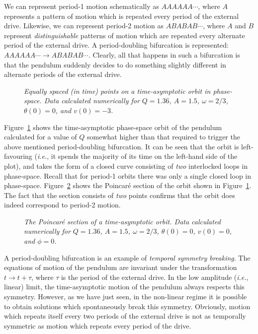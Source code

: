 We can represent period-1 motion schematically as $AAAAAA\cdots$, where $A$ represents a pattern
of motion which is repeated every period of the external drive. Likewise, we can represent
period-2 motion as $ABABAB\cdots$, where $A$ and $B$ represent {\em distinguishable}\/  patterns of motion
which are repeated every alternate period of the external drive. A period-doubling
bifurcation is represented: $AAAAAA\cdots\rightarrow ABABAB\cdots$. Clearly, all that happens
in such a bifurcation is that the pendulum suddenly decides to do something slightly different in
alternate periods of the external drive.

\begin{figure}
\epsfysize=2.5in
\centerline{}
\caption{\em Equally spaced (in time) points on a time-asymptotic orbit in phase-space. Data
calculated numerically for $Q=1.36$, $A=1.5$, $\omega=2/3$, $\theta(0)=0$,
and $v(0)=-3$. }\label{f30}
\end{figure}

Figure~\ref{f30} shows the time-asymptotic phase-space orbit of the pendulum calculated for a
value of $Q$ somewhat higher than that required to trigger the above mentioned period-doubling bifurcation. It can
be seen that the orbit is left-favouring ({\em i.e.}, it spends the majority of its time on
the left-hand side of the plot), and takes the form of a closed curve consisting of
{\em two}\/ interlocked loops in phase-space.
Recall that for period-1 orbits there was only a single closed  loop in phase-space.
Figure~\ref{f31} shows the Poincar\'{e} section of the orbit shown in Figure~\ref{f30}. 
The fact that the section consists
of {\em two}\/ points confirms that the orbit does indeed correspond to period-2 motion.

\begin{figure}
\epsfysize=2.5in
\centerline{}
\caption{\em The Poincar\'{e} section of a time-asymptotic
orbit. Data calculated numerically for $Q=1.36$, $A=1.5$, $\omega=2/3$, $\theta(0)=0$,
$v(0)=0$, and $\phi=0$. }\label{f31}
\end{figure}

A period-doubling bifurcation is an example of {\em temporal symmetry breaking}. The equations of
motion of the pendulum are invariant under the transformation $t\rightarrow t+\tau$, where
$\tau$ is the period of the external drive. In the low amplitude ({\em i.e.}, linear) limit, 
the time-asymptotic motion of the pendulum always respects this symmetry. However, as we have just seen, in the
non-linear regime it is possible to obtain solutions which spontaneously break this  symmetry.
Obviously, motion which repeats itself every two periods of the external drive is not
as temporally symmetric as motion which repeats every period of the drive. 

